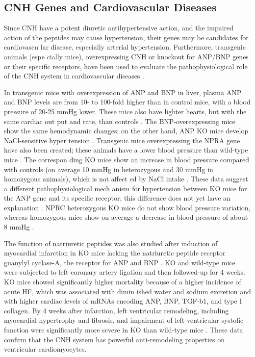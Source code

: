 \documentclass[14pt,a4paper,onecolumn]{extarticle}
\begin{document}
\subsection{CNH Genes and Cardiovascular Diseases
}
Since CNH have a potent diuretic antihypertensive action, and the impaired action of the peptides may cause hypertension, their genes may be candidates for cardiovascu lar disease, especially arterial hypertension. Furthermore, transgenic animals (espe cially mice), overexpressing CNH or knockout for ANP/BNP genes or their specific receptors, have been used to evaluate the pathophysiological role of the CNH system in cardiovascular diseases \citep{251}.

In transgenic mice with overexpression of ANP and BNP in liver, plasma ANP and BNP levels are from 10- to 100-fold higher than in control mice, with a blood pressure of 20-25 mmHg lower. These mice also have lighter hearts, but with the same cardiac out put and rate, than controls \citep{251}\citep{253-255}. The BNP-overexpressing mice show the same hemodynamic changes; on the other hand, ANP KO mice develop NaCl-sensitive hyper tension \citep{251}. Transgenic mice overexpressing the NPRA gene have also been created; these animals have a lower blood pressure than wild-type mice \citep{251}. The correspon ding KO mice show an increase in blood pressure compared with controls (on average 10 mmHg in heterozygous and 30 mmHg in homozygous animals), which is not affect ed by NaCl intake \citep{254}\citep{255}. These data suggest a different pathophysiological mech anism for hypertension between KO mice for the ANP gene and its specific receptor; this difference does not yet have an explanation \citep{251}. NPRC heterozygous KO mice do not show blood pressure variation, whereas homozygous mice show on average a decrease in blood pressure of about 8 mmHg \citep{251}.

The function of natriuretic peptides was also studied after induction of myocardial infarction in KO mice lacking the natriuretic peptide receptor guanylyl cyclase-A, the receptor for ANP and BNP \citep{89}. KO and wild-type mice were subjected to left coronary artery ligation and then followed-up for 4 weeks. KO mice showed significantly higher mortality because of a higher incidence of acute HF, which was associated with dimin ished water and sodium excretion and with higher cardiac levels of mRNAs encoding ANP, BNP, TGF-b1, and type I collagen. By 4 weeks after infarction, left ventricular remodeling, including myocardial hypertrophy and fibrosis, and impairment of left ventricular systolic function were significantly more severe in KO than wild-type mice \citep{89}. These data confirm that the CNH system has powerful anti-remodeling properties on ventricular cardiomyocytes.
\end{document}
